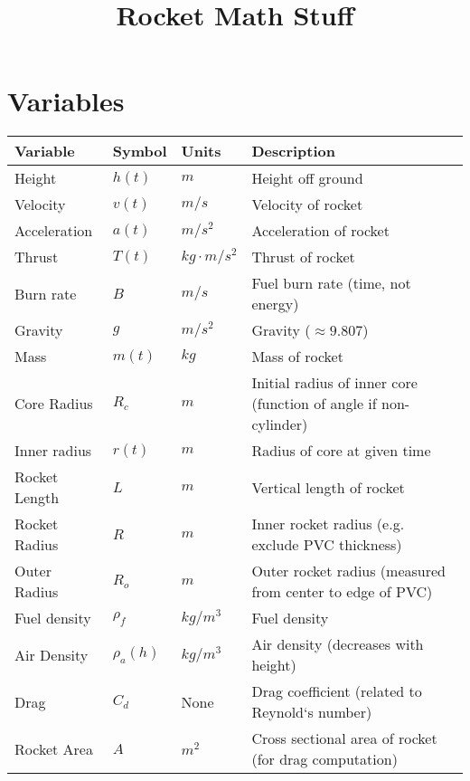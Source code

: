 \documentclass[12pt,a4paper]{article}
\title{Rocket Math Stuff}
\date{}
\begin{document}
\maketitle


\section{Variables}


\begin{tabular}{l | l | l | l}
    \textbf{Variable} & \textbf{Symbol} & \textbf{Units} & \textbf{Description} \\
    \hline
    Height          & $h(t)$      & $m$              & Height off ground \\
    Velocity        & $v(t)$      & $m/s$            & Velocity of rocket \\
    Acceleration    & $a(t)$      & $m/s^2$          & Acceleration of rocket \\
    Thrust          & $T(t)$      & $kg\cdot m/s^2$  & Thrust of rocket \\
    Burn rate       & $B$         & $m/s$            & Fuel burn rate (time, not energy) \\
    Gravity         & $g$         & $m/s^2$          & Gravity ($\approx 9.807$) \\
    Mass            & $m(t)$      & $kg$             & Mass of rocket \\
    Core Radius     & $R_c$       & $m$              & Initial radius of inner core (function of angle if non-cylinder) \\
    Inner radius    & $r(t)$      & $m$              & Radius of core at given time \\
    Rocket Length   & $L$         & $m$              & Vertical length of rocket \\
    Rocket Radius   & $R$         & $m$              & Inner rocket radius (e.g. exclude PVC thickness) \\
    Outer Radius    & $R_o$       & $m$              & Outer rocket radius (measured from center to edge of PVC) \\
    Fuel density    & $\rho_f$    & $kg/m^3$         & Fuel density \\
    Air Density     & $\rho_a(h)$ & $kg/m^3$         & Air density (decreases with height) \\
    Drag            & $C_d$       & None             & Drag coefficient (related to Reynold‘s number) \\
    Rocket Area     & $A$         & $m^2$            & Cross sectional area of rocket (for drag computation) \\
\end{tabular}
\end{document}
